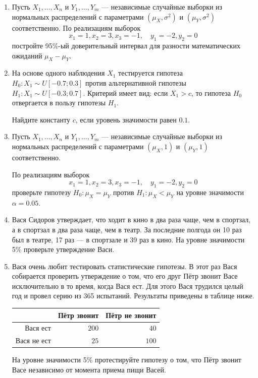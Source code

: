 \begin{enumerate}
\item Пусть $X_{1}, \ldots, X_{n}$ и $Y_{1}, \ldots, Y_{m}$ —
независимые случайные выборки из нормальных распределений с параметрами
$(\mu_{X},\sigma^2)$ и $(\mu_{Y},\sigma^2)$ соответственно.
По реализациям выборок
\[
x_{1} = 1,  x_{2} = 3, x_{3} = -1, \quad
y_{1} = -2,  y_{2} = 0
\]
постройте 95\%-ый доверительный интервал для разности математических ожиданий
$\mu_{X} - \mu_{Y}$.

\item На основе одного наблюдения $X_{1}$
тестируется гипотеза $H_{0} : X_{1} \sim U[-0.7;0.3]$ против альтернативной гипотезы
$H_{1}: X_{1} \sim U[-0.3;0.7]$.
Критерий имеет вид: если $X_{1} > c$,
то гипотеза $H_{0}$ отвергается в пользу гипотезы $H_{1}$.

Найдите константу $c$, если уровень значимости равен $0.1$.

\item  Пусть $X_{1}, \ldots, X_{n}$ и $Y_{1}, \ldots, Y_{m}$ —
независимые случайные выборки из нормальных распределений
с параметрами $(\mu_{X}, 1)$ и $(\mu_{Y}, 1)$ соответственно.

По реализациям выборок
\[
x_{1} = 1,  x_{2} = 3, x_{3} = -1, \quad
y_{1} = -2,  y_{2} = 0
\]
проверьте гипотезу $H_{0}:\mu_{X} = \mu_{Y}$ против $H_{1}:\mu_{X} < \mu_{Y}$ на уровне значимости $\alpha = 0.05$.


\item  Вася Сидоров утверждает, что ходит в кино в два раза чаще, чем в спортзал,
а в спортзал в два раза чаще, чем в театр.
За последние полгода он 10 раз был в театре, 17 раз — в спортзале и 39 раз в кино.
На уровне значимости 5\% проверьте утверждение Васи.

\item Вася очень любит тестировать статистические гипотезы.
В этот раз Вася собирается проверить утверждение о том,
что его друг Пётр звонит Васе исключительно в то время, когда Вася ест.
Для этого Вася трудился целый год и провел серию из 365 испытаний.
Результаты приведены в таблице ниже.

\begin{center}\begin{tabular}{rrr}
\toprule
	& Пётр звонит   & Пётр не звонит  \\ \midrule
Вася ест           & $200$ & $40$ \\
	Вася не ест       & $25$ & $100$  \\ \bottomrule
\end{tabular}\end{center}

На уровне значимости 5\% протестируйте гипотезу о том, что Пётр звонит Васе
независимо от момента приема пищи Васей.


\end{enumerate}
	
